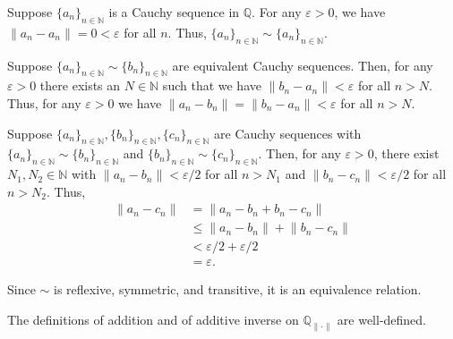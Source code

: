 \documentclass[12 pt, letterpaper]{hmcpset}
\begin{document}
\begin{solution}
	Suppose $\{ a_{n} \}_{n \in \mathbb{N}}$ is a Cauchy sequence in $\mathbb{Q}$. For any $\varepsilon > 0$, we have $\lVert a_{n} - a_{n} \rVert = 0 < \varepsilon$ for all $n$. Thus, $\{ a_{n} \}_{n \in \mathbb{N}} \sim \{ a_{n} \}_{n \in \mathbb{N}}$.

	Suppose $\{ a_{n} \}_{n \in \mathbb{N}} \sim \{ b_{n} \}_{n \in \mathbb{N}}$ are equivalent Cauchy sequences. Then, for any $\varepsilon > 0$ there exists an $N \in \mathbb{N}$ such that we have $\lVert b_{n} - a_{n} \rVert < \varepsilon$ for all $n > N$. Thus, for any $\varepsilon > 0$ we have $\lVert a_{n} - b_{n} \rVert = \lVert b_{n} - a_{n} \rVert < \varepsilon$ for all $n > N$.

	Suppose $\{ a_{n} \}_{n \in \mathbb{N}}, \{ b_{n} \}_{n \in \mathbb{N}}, \{ c_{n} \}_{n \in \mathbb{N}}$ are Cauchy sequences with $\{ a_{n} \}_{n \in \mathbb{N}} \sim \{ b_{n} \}_{n \in \mathbb{N}}$ and $\{ b_{n} \}_{n \in \mathbb{N}} \sim \{ c_{n} \}_{n \in \mathbb{N}}$. Then, for any $\varepsilon > 0$, there exist $N_{1}, N_{2} \in \mathbb{N}$ with $\lVert a_{n} - b_{n} \rVert < \varepsilon / 2$ for all $n > N_{1}$ and $\lVert b_{n} - c_{n} \rVert < \varepsilon / 2$ for all $n > N_{2}$. Thus,
	\begin{align*}
		\lVert a_{n} - c_{n} \rVert & = \lVert a_{n} - b_{n} + b_{n} - c_{n} \rVert \\
					    & \le \lVert a_{n} - b_{n} \rVert + \lVert b_{n} - c_{n} \rVert \\
					    & < \varepsilon/2 + \varepsilon/2 \\
					    & = \varepsilon.
	\end{align*}

	Since $\sim$ is reflexive, symmetric, and transitive, it is an equivalence relation.
\end{solution}

\pagebreak

\begin{problem}[(6)]
	The definitions of addition and of additive inverse on $\mathbb{Q}_{\lVert \cdot \rVert}$ are well-defined.
\end{problem}
\end{document}
